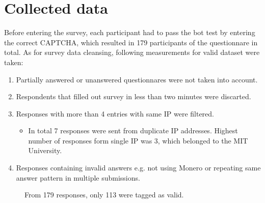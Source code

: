 \documentclass[
  printed, %
  table,   %
  nolof,     %
  nolot,     %
           oneside, color
]{fithesis3}
\begin{document}
\section{Collected data}
Before entering the survey, each participant had to pass the bot test by entering the correct CAPTCHA, which resulted in 179 participants of the questionnare in total. As for survey data cleansing, following measurements for valid dataset were taken:
\begin{enumerate}
\itemsep0em
\item Partially answered or unanswered questionnares were not taken into account. 
\item Respondents that filled out survey in less than two minutes were discarted.
\item Responses with more than 4 entries with same IP were filtered.
\begin{itemize}
\item In total 7 responses were sent from duplicate IP addresses. Highest number of responses form single IP was 3, which belonged to the MIT University.
\end{itemize}
\item Responses containing invalid answers e.g. not using Monero or repeating same answer pattern in multiple submissions.

\end{enumerate}
\begin{center}
\begin{figure}[H]
\caption{From 179 responses, only 113 were tagged as valid.}
\label{chart:price}\end{figure}\end{center}
\end{document}
